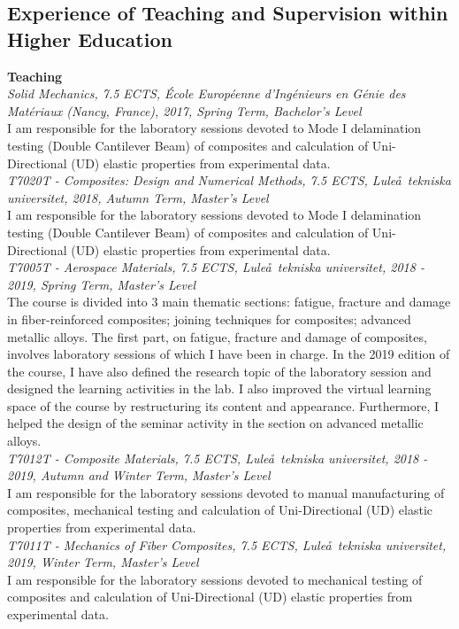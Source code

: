 \documentclass[
  a4paper, 
]{fortysecondscv}
\begin{document}
\subsection{Experience of Teaching and Supervision within Higher Education}
\textbf{Teaching}\\[3pt]
\textit{Solid Mechanics, 7.5 ECTS, \'Ecole Europ\'eenne d'Ing\'enieurs en G\'enie des Mat\'eriaux (Nancy, France), 2017, Spring Term, Bachelor's Level}\\
I am responsible for the laboratory sessions devoted to Mode I delamination testing (Double Cantilever Beam) of composites and calculation of Uni-Directional (UD) elastic properties from experimental data.\\[3pt]
\textit{T7020T - Composites: Design and Numerical Methods, 7.5 ECTS, Lule\aa\ tekniska universitet, 2018, Autumn Term, Master's Level}\\
I am responsible for the laboratory sessions devoted to Mode I delamination testing (Double Cantilever Beam) of composites and calculation of Uni-Directional (UD) elastic properties from experimental data.\\[3pt]
\textit{T7005T - Aerospace Materials, 7.5 ECTS, Lule\aa\ tekniska universitet, 2018 - 2019, Spring Term, Master's Level}\\
The course is divided into 3 main thematic sections: fatigue, fracture and damage in fiber-reinforced composites; joining techniques for composites; advanced metallic alloys. The first part, on fatigue, fracture and damage of composites, involves laboratory sessions of which I have been in charge. In the 2019 edition of the course, I have also defined the research topic of the laboratory session and designed the learning activities in the lab. I also improved the virtual learning space of the course by restructuring its content and appearance. Furthermore, I helped the design of the seminar activity in the section on advanced metallic alloys.\\[3pt]
\textit{T7012T - Composite Materials, 7.5 ECTS, Lule\aa\ tekniska universitet, 2018 - 2019, Autumn and Winter Term, Master's Level}\\
I am responsible for the laboratory sessions devoted to manual manufacturing of composites, mechanical testing and calculation of Uni-Directional (UD) elastic properties from experimental data.\\[3pt]
\textit{T7011T - Mechanics of Fiber Composites, 7.5 ECTS, Lule\aa\ tekniska universitet, 2019, Winter Term, Master's Level}\\
I am responsible for the laboratory sessions devoted to mechanical testing of composites and calculation of Uni-Directional (UD) elastic properties from experimental data.\\[3pt]
\end{document}
